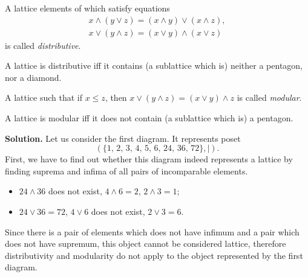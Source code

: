 \documentclass[14pt,a4paper]{extarticle}
\begin{document}
	\begin{definition}
		A lattice elements of which satisfy equations
		\begin{align*}
			x \land (y \lor z) = (x \land y) \lor (x \land z),\\
			x \lor (y \land z) = (x \lor y) \land (x \lor z)
		\end{align*}
		is called \textit{distributive}.
	\end{definition}
	
	\begin{theorem} 
		A lattice is distributive iff it contains (a sublattice which is) neither a pentagon, nor a diamond.
	\end{theorem}
	
	\begin{definition}
		A lattice such that if $x\leq z$, then $x\lor (y \land z) = (x \lor y) \land z$ is called \textit{modular}.
	\end{definition}
	
	\begin{theorem} 
		A lattice is modular iff it does not contain (a sublattice which is) a pentagon.
	\end{theorem}
	
	\noindent\textbf{Solution.} Let us consider the first diagram. It represents poset
	\[(\{1,\,2,\,3,\,4,\,5,\,6,\,24,\,36,\,72\},|).\]
	First, we have to find out whether this diagram indeed represents a lattice by finding suprema and infima of all pairs of incomparable elements.
	\begin{itemize}
		\item $24 \land 36$ does not exist, $4 \land 6 = 2$, $2 \land 3 = 1$;
		\item $24 \lor 36 = 72$, $4 \lor 6$ does not exist, $2 \lor 3 = 6$.
	\end{itemize}
	Since there is a pair of elements which does not have infimum and a pair which does not have supremum, this object cannot be considered lattice, therefore distributivity and modularity do not apply to the object represented by the first diagram.
	
\end{document}
